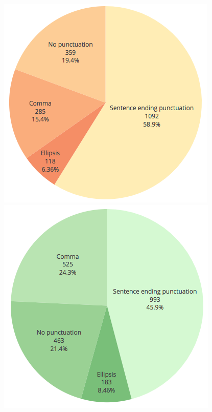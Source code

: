 \begin{figure}[h]
    \centering
    \begin{minipage}{.5\textwidth}
        \centering
        \includegraphics[width=\linewidth]{img/if_pause_then_punctuation_ENG.png}
    \end{minipage}%
    \begin{minipage}{0.5\textwidth}
        \centering
        \includegraphics[width=\linewidth]{img/if_pause_then_punctuation_SPA.png}

\end{minipage}
\end{figure}
